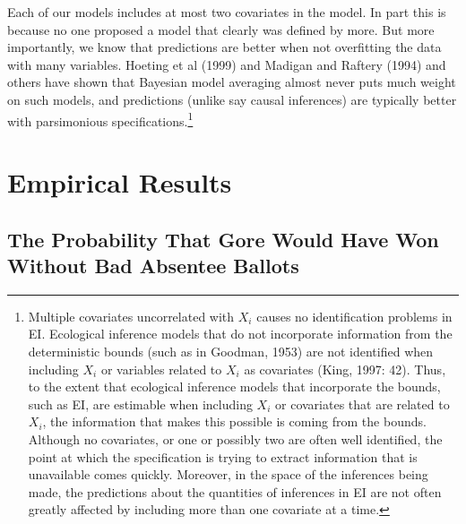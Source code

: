 \documentclass[11pt,titlepage]{article}
\begin{document}
Each of our models includes at most two covariates in the model.  In
part this is because no one proposed a model that clearly was defined
by more.  But more importantly, we know that predictions are better
when not overfitting the data with many variables.  Hoeting et al
(1999) and Madigan and Raftery (1994) and others have shown that
Bayesian model averaging almost never puts much weight on such models,
and predictions (unlike say causal inferences) are typically better
with parsimonious specifications.\footnote{Multiple covariates
  uncorrelated with $X_i$ causes no identification problems in EI.
  Ecological inference models that do not incorporate information from
  the deterministic bounds (such as in Goodman,
  1953\nocite{goodman53}) are not identified when including $X_i$ or
  variables related to $X_i$ as covariates (King, 1997: 42).  Thus, to
  the extent that ecological inference models that incorporate the
  bounds, such as EI, are estimable when including $X_i$ or covariates
  that are related to $X_i$, the information that makes this possible
  is coming from the bounds.  Although no covariates, or one or
  possibly two are often well identified, the point at which the
  specification is trying to extract information that is unavailable
  comes quickly.  Moreover, in the space of the inferences being made,
  the predictions about the quantities of inferences in EI are not
  often greatly affected by including more than one covariate at a
  time.}

\section{Empirical Results}
\label{s:outcome}

\subsection{The Probability That Gore Would Have Won Without Bad 
Absentee Ballots}
\end{document}
